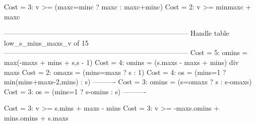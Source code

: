 Cost =  3:  v >= (maxc=minc ? maxc : maxc+minc)
Cost =  2:  v >= minmaxc + maxc

--------------------------------------------------------------------------------
Handle table low_s_mins_maxs_v of 15
--------------------------------------------------------------------------------
Cost =  5:  omins = max(-maxs + mins + s,s - 1)
Cost =  4:  omins = (s.maxs - maxs + mins) div maxs
Cost =  2:  omaxs = (mins=maxs ? s : 1)
Cost =  4:  os    = (mins=1 ? min(mins+maxs-2,mins) : s)
----------
Cost =  3:  omins = (s=omaxs ? s : s-omaxs)
Cost =  3:  os    = (mins=1 ? s-omins : s)
----------

Cost =  3:  v >= s.mins + maxs - mins
Cost =  3:  v >= -maxs.omins + mins.omins + s.maxs

